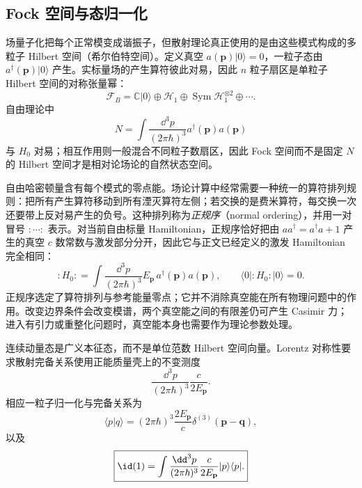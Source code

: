 \subsection{Fock 空间与态归一化}

场量子化把每个正常模变成谐振子，但散射理论真正使用的是由这些模式构成的多粒子 Hilbert 空间（希尔伯特空间）。定义真空 $a(\mathbf p)|0\rangle=0$，一粒子态由 $a^\dagger(\mathbf p)|0\rangle$ 产生。实标量场的产生算符彼此对易，因此 $n$ 粒子扇区是单粒子 Hilbert 空间的对称张量幂：
\begin{equation*}
\mathscr F_B
=\mathbb C|0\rangle\oplus\mathcal H_1
\oplus\operatorname{Sym}\mathcal H_1^{\otimes2}\oplus\cdots .
\end{equation*}
自由理论中
\begin{equation*}
N=\int\frac{\dd^3 p}{(2\pi\hbar)^3}a^\dagger(\mathbf p)a(\mathbf p)
\end{equation*}
与 $H_0$ 对易；相互作用则一般混合不同粒子数扇区，因此 Fock 空间而不是固定 $N$ 的 Hilbert 空间才是相对论场论的自然状态空间。

自由哈密顿量含有每个模式的零点能。场论计算中经常需要一种统一的算符排列规则：把所有产生算符移动到所有湮灭算符左侧；若交换的是费米算符，每交换一次还要带上反对易产生的负号。这种排列称为\emph{正规序}（normal ordering），并用一对冒号 $:\!\cdots\!:$ 表示。对当前自由标量 Hamiltonian，正规序恰好把由 $aa^\dagger=a^\dagger a+1$ 产生的真空 $c$ 数常数与激发部分分开，因此它与正文已经定义的激发 Hamiltonian 完全相同：
\begin{equation}
\boxed{
:\!H_0\!:
=\int\frac{\dd^3 p}{(2\pi\hbar)^3}
E_{\mathbf p}\,a^\dagger(\mathbf p)a(\mathbf p),
\qquad \langle0|:\!H_0\!:|0\rangle=0.}
\label{eq:normal-H-r2}
\end{equation}
正规序选定了算符排列与参考能量零点；它并不消除真空能在所有物理问题中的作用。改变边界条件会改变模谱，两个真空能之间的有限差仍可产生 Casimir 力；进入有引力或重整化问题时，真空能本身也需要作为理论参数处理。

连续动量态是广义本征态，而不是单位范数 Hilbert 空间向量。Lorentz 对称性要求散射完备关系使用正能质量壳上的不变测度
\begin{equation}
\boxed{
\frac{\dd^3 p}{(2\pi\hbar)^3}\frac{c}{2E_{\mathbf p}}.}
\label{eq:lorentz-measure-r2}
\end{equation}
相应一粒子归一化与完备关系为
\begin{equation*}
\langle p|q\rangle
=(2\pi\hbar)^3\frac{2E_{\mathbf p}}{c}
\delta^{(3)}(\mathbf p-\mathbf q),
\end{equation*}
以及
\begin{equation}
\boxed{
\id(1)
=\int\frac{\dd^3 p}{(2\pi\hbar)^3}\frac{c}{2E_{\mathbf p}}
|p\rangle\langle p|.}
\label{eq:one-particle-completeness-r2}
\end{equation}

